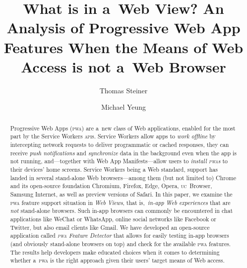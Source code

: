 \documentclass[sigconf]{acmart}
\begin{document}
\title[What is in a~Web View?]{What is in a~Web View? An Analysis of Progressive Web App Features When the Means of Web Access is not a~Web Browser}  



\author{Thomas Steiner}

\author{Michael Yeung}


\begin{abstract}
Progressive Web Apps (\textsc{pwa}) are a~new class of Web applications,
enabled for the most part by the Service Workers \textsc{api}s.
Service Workers allow apps to \emph{work offline}
by intercepting network requests to deliver programmatic or cached responses,
they can receive \emph{push notifications} and \emph{synchronize} data in the background
even when the app is not running,
and---together with Web App Manifests---allow users to \emph{install \textsc{pwa}s}
to their devices' home screens.
Service Workers being a Web standard, support has landed in several
stand-alone Web browsers---among them (but not limited to)
Chrome and its open-source foundation Chromium, Firefox, Edge, Opera,
\textsc{uc}~Browser, Samsung Internet, as well as preview versions of Safari.
In this paper, we examine the \textsc{pwa} feature support situation in \emph{Web Views},
that is,\ \emph{in-app Web experiences} that are \emph{not} stand-alone browsers.
Such in-app browsers can commonly be encountered in chat applications like WeChat or WhatsApp,
online social networks like Facebook or Twitter, but also email clients like Gmail.
We have developed an open-source application called \emph{\textsc{pwa} Feature Detector}
that allows for easily testing in-app browsers (and obviously stand-alone browsers on top)
and check for the available \textsc{pwa} features.
The results help developers make educated choices when it comes to determining
whether a~\textsc{pwa} is the right approach given their users' target means of Web access.
\end{abstract}
\end{document}
